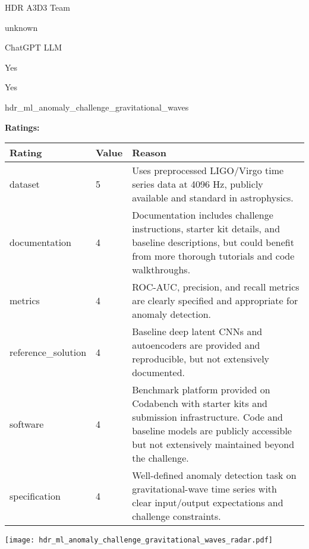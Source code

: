 {{\begin{description}[labelwidth=4cm, labelsep=1em, leftmargin=4cm, itemsep=0.1em, parsep=0em]
  \item[contact.name:] HDR A3D3 Team
  \item[contact.email:] unknown
  \item[results.links.name:] ChatGPT LLM
  \item[fair.reproducible:] Yes
  \item[fair.benchmark\_ready:] Yes
  \item[id:] hdr\_ml\_anomaly\_challenge\_gravitational\_waves
  \item[Citations:] \cite{campolongo2025buildingmachinelearningchallenges}
\end{description}

{\bf Ratings:} ~ \\

\begin{tabular}{p{} p{} p{}}
\hline
Rating & Value & Reason \\
\hline
dataset & 5 & Uses preprocessed LIGO/Virgo time series data at 4096 Hz, publicly available and standard in astrophysics.
 \\
documentation & 4 & Documentation includes challenge instructions, starter kit details, and baseline descriptions,
but could benefit from more thorough tutorials and code walkthroughs.
 \\
metrics & 4 & ROC-AUC, precision, and recall metrics are clearly specified and appropriate for anomaly detection.
 \\
reference\_solution & 4 & Baseline deep latent CNNs and autoencoders are provided and reproducible, but not extensively documented.
 \\
software & 4 & Benchmark platform provided on Codabench with starter kits and submission infrastructure.
Code and baseline models are publicly accessible but not extensively maintained beyond the challenge.
 \\
specification & 4 & Well-defined anomaly detection task on gravitational-wave time series with clear input/output
expectations and challenge constraints.
 \\
\hline
\end{tabular}

\texttt{[image: hdr\_ml\_anomaly\_challenge\_gravitational\_waves\_radar.pdf]}
}}
\clearpage